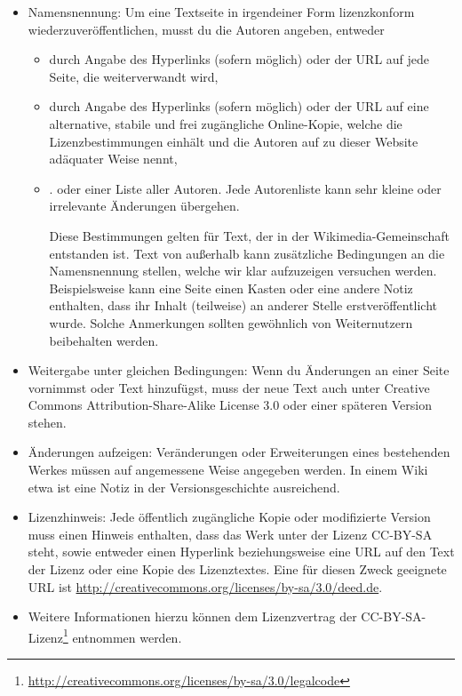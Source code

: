 \documentclass[10pt,a4paper]{article}
\begin{document}
\begin{itemize}

 \item Namensnennung: Um eine Textseite in irgendeiner Form lizenzkonform
 wiederzuveröffentlichen, musst du die Autoren angeben, entweder
 \begin{itemize}


  \item durch Angabe des Hyperlinks (sofern möglich) oder der URL auf jede
  Seite, die weiterverwandt wird,
  \item durch Angabe des Hyperlinks (sofern möglich) oder der URL auf eine
  alternative, stabile und frei zugängliche Online-Kopie, welche die
  Lizenzbestimmungen einhält und die Autoren auf zu dieser Website adäquater
  Weise nennt,
  \item. oder einer Liste aller Autoren. Jede Autorenliste kann sehr kleine
  oder irrelevante Änderungen übergehen.

  Diese Bestimmungen gelten für Text, der in der Wikimedia-Gemeinschaft
  entstanden ist. Text von außerhalb kann zusätzliche Bedingungen an die
  Namensnennung stellen, welche wir klar aufzuzeigen versuchen werden.
  Beispielsweise kann eine Seite einen Kasten oder eine andere Notiz enthalten,
  dass ihr Inhalt (teilweise) an anderer Stelle erstveröffentlicht wurde.
  Solche Anmerkungen sollten gewöhnlich von Weiternutzern beibehalten werden.

 \end{itemize}
 \item Weitergabe unter gleichen Bedingungen: Wenn du Änderungen an einer Seite
 vornimmst oder Text hinzufügst, muss der neue Text auch unter Creative Commons
 Attribution-Share-Alike License 3.0 oder einer späteren Version stehen.

 \item Änderungen aufzeigen: Veränderungen oder Erweiterungen eines bestehenden
 Werkes müssen auf angemessene Weise angegeben werden. In einem Wiki etwa ist
 eine Notiz in der Versionsgeschichte ausreichend.

 \item Lizenzhinweis: Jede öffentlich zugängliche Kopie oder modifizierte
 Version muss einen Hinweis enthalten, dass das Werk unter der Lizenz CC-BY-SA
 steht, sowie entweder einen Hyperlink beziehungsweise eine URL auf den Text
 der Lizenz oder eine Kopie des Lizenztextes. Eine für diesen Zweck geeignete
 URL ist \url{http://creativecommons.org/licenses/by-sa/3.0/deed.de}.

 \item Weitere Informationen hierzu können dem Lizenzvertrag der
 CC-BY-SA-Lizenz\footnote{\url{http://creativecommons.org/licenses/by-sa/3.0/legalcode}}
 entnommen werden.

\end{itemize}
\end{document}
